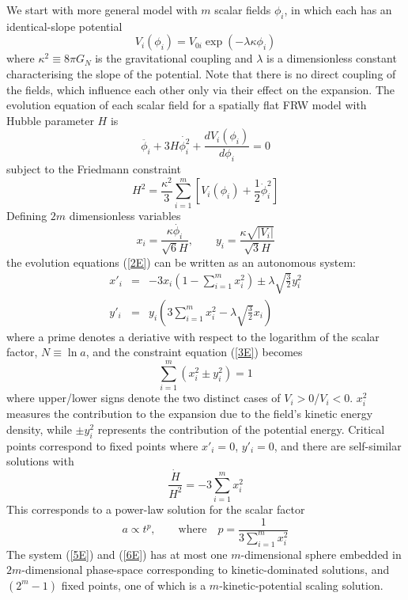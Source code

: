 \documentclass[a4paper,12pt]{article}
\begin{document}
We start with more general model with $m$ scalar
fields $\phi _i$, in which each has an identical-slope potential
\begin{equation}
V_i(\phi _i)=V_{0i}\exp{(-\lambda \kappa \phi _i)}
\end{equation}
where $\kappa ^2\equiv 8 \pi G_N$ is the gravitational coupling
and $\lambda$ is a dimensionless constant characterising the slope
of the potential.
Note that there is no direct coupling of the fields, which
influence each other only via their effect on the expansion.
The evolution equation of each scalar field for a
spatially flat FRW model with Hubble parameter $H$ is
\begin{equation}
\label{2E}
\ddot{\phi _i}+3H\dot{\phi _i^2}+\frac{dV_i(\phi _i)}{d\phi _i}=0
\end{equation}
subject to the Friedmann constraint
\begin{equation}
\label{3E}
H^2=\frac{\kappa ^2}{3}\sum_{i=1}^{m}[V_i(\phi
_i)+\frac{1}{2}\dot{\phi}_i^2]
\end{equation}
Defining $2m$ dimensionless variables
\begin{equation}
x_i=\frac{\kappa \dot{\phi _i}}{\sqrt{6}H}, \qquad
y_i=\frac{\kappa \sqrt{|V_i|}}{\sqrt{3}H}
\end{equation}
the evolution equations (\ref{2E}) can be written
as an autonomous system:
\begin{eqnarray}
\label{5E}
x'_i&=&-3x_i(1-\sum_{i=1}^{m}x_i^2)\pm \lambda \sqrt{\frac{3}{2}}y_i^2 \\
y'_i&=&y_i(3\sum_{i=1}^{m}x_i^2-\lambda \sqrt{\frac{3}{2}}x_i)
\label{6E}
\end{eqnarray}
where a prime denotes a deriative with respect to the logarithm of
the scalar factor, $N\equiv \ln a$, and the constraint equation
(\ref{3E}) becomes
\begin{equation}
\sum_{i=1}^{m}(x_i^2\pm y_i^2)=1
\end{equation}
where upper/lower signs denote the two distinct cases of $V_i>0$/$V_i<0$.
$x_i^2$ measures the contribution to the expansion due to the field's
kinetic energy density, while $\pm y_i^2$ represents the contribution
of the potential energy.
Critical points correspond to fixed points where $x'_i=0$,
$y'_i=0$, and there are self-similar solutions with
\begin{equation}
\frac{\dot{H}}{H^2}=-3\sum_{i=1}^{m}x_i^2
\end{equation}
This corresponds to a power-law solution for the scalar factor
\begin{equation}
a\propto t^p, \qquad \textrm{where} \quad
p=\frac{1}{3\sum_{i=1}^{m}x_i^2}
\end{equation}
The system (\ref{5E}) and (\ref{6E}) has at most one $m$-dimensional
sphere embedded in $2m$-dimensional phase-space corresponding to
kinetic-dominated solutions, and $(2^m-1)$ fixed points, one of
which is a $m$-kinetic-potential scaling solution.
\end{document}
